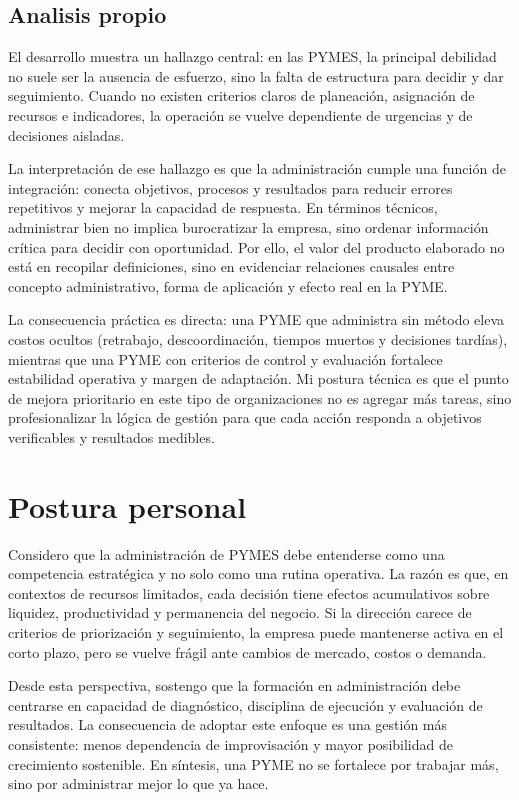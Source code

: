 \documentclass[
	spanish,
	letterpaper, oneside
]{article}
\begin{document}
\subsection{Analisis propio}

El desarrollo muestra un hallazgo central: en las PYMES, la principal debilidad no suele ser la ausencia de esfuerzo, sino la falta de estructura para decidir y dar seguimiento. Cuando no existen criterios claros de planeación, asignación de recursos e indicadores, la operación se vuelve dependiente de urgencias y de decisiones aisladas.

La interpretación de ese hallazgo es que la administración cumple una función de integración: conecta objetivos, procesos y resultados para reducir errores repetitivos y mejorar la capacidad de respuesta. En términos técnicos, administrar bien no implica burocratizar la empresa, sino ordenar información crítica para decidir con oportunidad. Por ello, el valor del producto elaborado no está en recopilar definiciones, sino en evidenciar relaciones causales entre concepto administrativo, forma de aplicación y efecto real en la PYME.

La consecuencia práctica es directa: una PYME que administra sin método eleva costos ocultos (retrabajo, descoordinación, tiempos muertos y decisiones tardías), mientras que una PYME con criterios de control y evaluación fortalece estabilidad operativa y margen de adaptación. Mi postura técnica es que el punto de mejora prioritario en este tipo de organizaciones no es agregar más tareas, sino profesionalizar la lógica de gestión para que cada acción responda a objetivos verificables y resultados medibles.

\section{Postura personal}

Considero que la administración de PYMES debe entenderse como una competencia estratégica y no solo como una rutina operativa. La razón es que, en contextos de recursos limitados, cada decisión tiene efectos acumulativos sobre liquidez, productividad y permanencia del negocio. Si la dirección carece de criterios de priorización y seguimiento, la empresa puede mantenerse activa en el corto plazo, pero se vuelve frágil ante cambios de mercado, costos o demanda.

Desde esta perspectiva, sostengo que la formación en administración debe centrarse en capacidad de diagnóstico, disciplina de ejecución y evaluación de resultados. La consecuencia de adoptar este enfoque es una gestión más consistente: menos dependencia de improvisación y mayor posibilidad de crecimiento sostenible. En síntesis, una PYME no se fortalece por trabajar más, sino por administrar mejor lo que ya hace.
\end{document}
